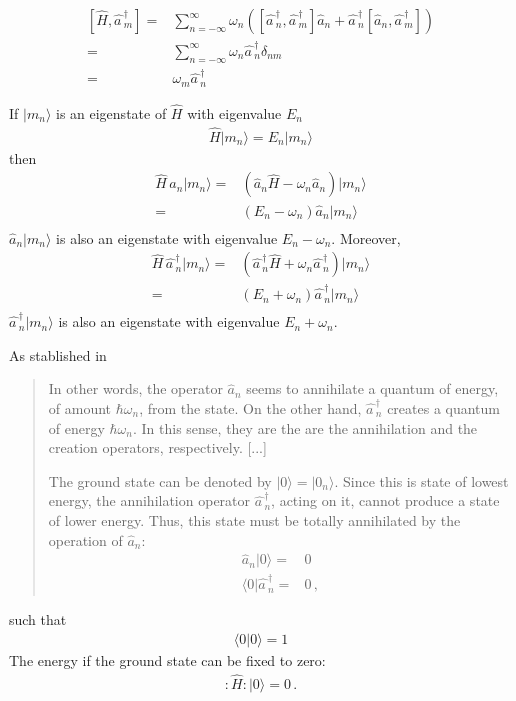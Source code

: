 \begin{frame}
\begin{align}
\label{eq:20}
   \left[\widehat{H},\widehat{a\,}_{m}^\dagger\right]=&
\sum_{n=-\infty}^{\infty} \omega_n\left(
\left[\widehat{a\,}_{n}^\dagger,\widehat{a\,}_{m}^\dagger\right]\widehat{a}_{n}
+\widehat{a\,}_{n}^\dagger\left[\widehat{a}_{n},\widehat{a\,}_{m}^\dagger\right]
\right)\nonumber\\
=&\sum_{n=-\infty}^{\infty} \omega_n
\widehat{a\,}_{n}^\dagger\delta_{n m}
\nonumber\\
=& \omega_m\widehat{a\,}_{n}^\dagger
\end{align}

If $|m_n\rangle$ is an eigenstate of $\widehat{H}$ with eigenvalue $E_n$
\begin{align}
  \widehat{H}|m_n\rangle=E_n|m_n\rangle
\end{align}
then
\begin{align}
  \widehat{H}\,\widehat{a}_{n}|m_n\rangle=&
\left(\widehat{a}_{n}\widehat{H}-\omega_n\widehat{a}_{n}\right)|m_n\rangle\nonumber\\
=&\left(E_n-\omega_n\right)\widehat{a}_{n}|m_n\rangle\nonumber\\
\end{align}
$\widehat{a}_{n}|m_n\rangle$ is also an eigenstate with eigenvalue $E_n-\omega_n$. Moreover,
\begin{align}
  \widehat{H}\,\widehat{a\,}_{n}^\dagger|m_n\rangle=&
\left(\widehat{a\,}_{n}^\dagger\widehat{H}+\omega_n\widehat{a\,}_{n}^\dagger\right)|m_n\rangle\nonumber\\
=&\left(E_n+\omega_n\right)\widehat{a\,}_{n}^\dagger|m_n\rangle\nonumber\\
\end{align}
$\widehat{a\,}_{n}^\dagger|m_n\rangle$ is also an eigenstate with eigenvalue $E_n+\omega_n$. 

As stablished in \cite{Lahiri:2005sm}
\begin{quote}
  In other words, the operator $\widehat{a}_{n}$ seems to annihilate a quantum of energy, of amount $\hbar\omega_n$, from the state. On the other hand, 
  $\widehat{a\,}_{n}^\dagger$ creates a quantum of energy $\hbar\omega_n$. In this sense, they are the are the annihilation and the creation operators, respectively. [...]

The ground state can be denoted by $|0\rangle=|0_n\rangle$. Since this is state of lowest energy, the annihilation operator $\widehat{a\,}_{n}^\dagger$,
acting on it, cannot produce a state of lower energy. Thus, this state must be totally annihilated by the operation of $\widehat{a}_{n}$:
\begin{align}
  \widehat{a}_{n}|0\rangle=&0\nonumber\\
\langle0|\widehat{a\,}_{n}^\dagger=&0\,,
\end{align}
\end{quote}
such that
\begin{align}
  \langle0|0\rangle=1
\end{align}
The energy if the ground state can be fixed to zero:
\begin{align}
  :\widehat{H}:|0\rangle=0\,.
\end{align}


\end{frame}

